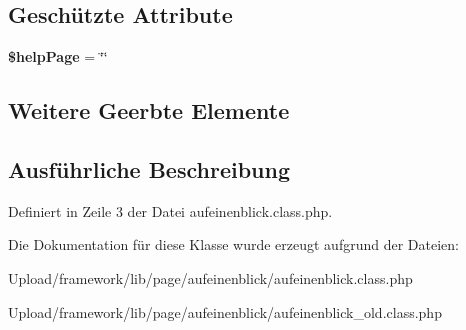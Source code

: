 \subsection*{Geschützte Attribute}
\begin{DoxyCompactItemize}
\item 
\mbox{\label{classaufeinenblick_ae2c1680c276abdd7dab5d8aed2edd920}} 
{\bfseries \$help\+Page} = \char`\"{}\char`\"{}
\end{DoxyCompactItemize}
\subsection*{Weitere Geerbte Elemente}


\subsection{Ausführliche Beschreibung}


Definiert in Zeile 3 der Datei aufeinenblick.\+class.\+php.



Die Dokumentation für diese Klasse wurde erzeugt aufgrund der Dateien\+:\begin{DoxyCompactItemize}
\item 
Upload/framework/lib/page/aufeinenblick/aufeinenblick.\+class.\+php\item 
Upload/framework/lib/page/aufeinenblick/aufeinenblick\+\_\+old.\+class.\+php\end{DoxyCompactItemize}
